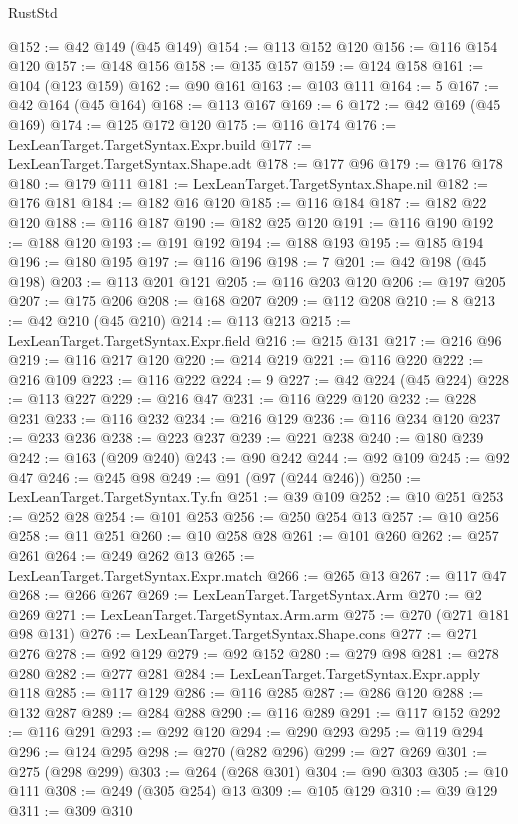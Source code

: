 \begin{lexlean}{RustStd}
\begin{coremodule}
@152 := @42 @149 (@45 @149)
@154 := @113 @152 @120
@156 := @116 @154 @120
@157 := @148 @156
@158 := @135 @157
@159 := @124 @158
@161 := @104 (@123 @159)
@162 := @90 @161
@163 := @103 @111
@164 := 5
@167 := @42 @164 (@45 @164)
@168 := @113 @167
@169 := 6
@172 := @42 @169 (@45 @169)
@174 := @125 @172 @120
@175 := @116 @174
@176 := LexLeanTarget.TargetSyntax.Expr.build
@177 := LexLeanTarget.TargetSyntax.Shape.adt
@178 := @177 @96
@179 := @176 @178
@180 := @179 @111
@181 := LexLeanTarget.TargetSyntax.Shape.nil
@182 := @176 @181
@184 := @182 @16 @120
@185 := @116 @184
@187 := @182 @22 @120
@188 := @116 @187
@190 := @182 @25 @120
@191 := @116 @190
@192 := @188 @120
@193 := @191 @192
@194 := @188 @193
@195 := @185 @194
@196 := @180 @195
@197 := @116 @196
@198 := 7
@201 := @42 @198 (@45 @198)
@203 := @113 @201 @121
@205 := @116 @203 @120
@206 := @197 @205
@207 := @175 @206
@208 := @168 @207
@209 := @112 @208
@210 := 8
@213 := @42 @210 (@45 @210)
@214 := @113 @213
@215 := LexLeanTarget.TargetSyntax.Expr.field
@216 := @215 @131
@217 := @216 @96
@219 := @116 @217 @120
@220 := @214 @219
@221 := @116 @220
@222 := @216 @109
@223 := @116 @222
@224 := 9
@227 := @42 @224 (@45 @224)
@228 := @113 @227
@229 := @216 @47
@231 := @116 @229 @120
@232 := @228 @231
@233 := @116 @232
@234 := @216 @129
@236 := @116 @234 @120
@237 := @233 @236
@238 := @223 @237
@239 := @221 @238
@240 := @180 @239
@242 := @163 (@209 @240)
@243 := @90 @242
@244 := @92 @109
@245 := @92 @47
@246 := @245 @98
@249 := @91 (@97 (@244 @246))
@250 := LexLeanTarget.TargetSyntax.Ty.fn
@251 := @39 @109
@252 := @10 @251
@253 := @252 @28
@254 := @101 @253
@256 := @250 @254 @13
@257 := @10 @256
@258 := @11 @251
@260 := @10 @258 @28
@261 := @101 @260
@262 := @257 @261
@264 := @249 @262 @13
@265 := LexLeanTarget.TargetSyntax.Expr.match
@266 := @265 @13
@267 := @117 @47
@268 := @266 @267
@269 := LexLeanTarget.TargetSyntax.Arm
@270 := @2 @269
@271 := LexLeanTarget.TargetSyntax.Arm.arm
@275 := @270 (@271 @181 @98 @131)
@276 := LexLeanTarget.TargetSyntax.Shape.cons
@277 := @271 @276
@278 := @92 @129
@279 := @92 @152
@280 := @279 @98
@281 := @278 @280
@282 := @277 @281
@284 := LexLeanTarget.TargetSyntax.Expr.apply @118
@285 := @117 @129
@286 := @116 @285
@287 := @286 @120
@288 := @132 @287
@289 := @284 @288
@290 := @116 @289
@291 := @117 @152
@292 := @116 @291
@293 := @292 @120
@294 := @290 @293
@295 := @119 @294
@296 := @124 @295
@298 := @270 (@282 @296)
@299 := @27 @269
@301 := @275 (@298 @299)
@303 := @264 (@268 @301)
@304 := @90 @303
@305 := @10 @111
@308 := @249 (@305 @254) @13
@309 := @105 @129
@310 := @39 @129
@311 := @309 @310

\end{coremodule}
\end{lexlean}
